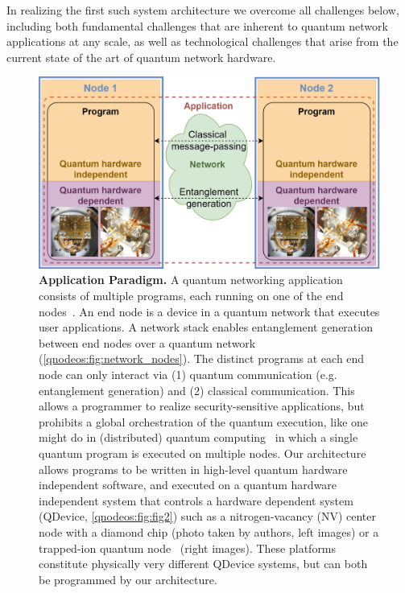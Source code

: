 In realizing the first such system architecture we overcome all challenges below, including both fundamental challenges that are inherent to quantum network applications at any scale, as well as technological challenges that arise from the current state of the art of quantum network hardware.

\begin{figure}
\centering
\includegraphics[width=1\linewidth]{figures/qnodeos/main/fig1/fig1.png}
\caption{\textbf{Application Paradigm.}
A quantum networking application consists of multiple programs, each running on one of the end nodes~\cite{dahlberg_2022_netqasm}.
An end node is a device in a quantum network that executes user applications.
A network stack enables entanglement generation between end nodes over a quantum network (\cref{qnodeos:fig:network_nodes}).
The distinct programs at each end node can only interact via (1) quantum communication (e.g. entanglement generation) and (2) classical communication.
This allows a programmer to realize security-sensitive applications, but prohibits a global orchestration of the quantum execution, like one might do in (distributed) quantum computing~\cite{caleffi_distributed_2022} in which a single quantum program is executed on multiple nodes.
Our architecture allows programs to be written in high-level quantum hardware independent software, and executed on a quantum hardware independent system  that controls a hardware dependent system (QDevice, \cref{qnodeos:fig:fig2}) such as a nitrogen-vacancy (NV) center node with a diamond chip (photo taken by authors, left images) or a trapped-ion quantum node~\cite{teller2023integrating} (right images).
These platforms constitute physically very different QDevice systems, but can both be programmed by our architecture.}
\label{qnodeos:fig:fig1}
\end{figure}




